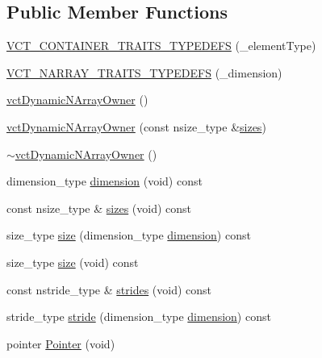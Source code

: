 \subsection*{Public Member Functions}
\begin{DoxyCompactItemize}
\item 
\hyperlink{classvct_dynamic_n_array_owner_af8830d5911394c8a495eb40b5a94d23e}{V\+C\+T\+\_\+\+C\+O\+N\+T\+A\+I\+N\+E\+R\+\_\+\+T\+R\+A\+I\+T\+S\+\_\+\+T\+Y\+P\+E\+D\+E\+F\+S} (\+\_\+element\+Type)
\item 
\hyperlink{classvct_dynamic_n_array_owner_af1c5a0cfd6c57067bd63c10e078c20c8}{V\+C\+T\+\_\+\+N\+A\+R\+R\+A\+Y\+\_\+\+T\+R\+A\+I\+T\+S\+\_\+\+T\+Y\+P\+E\+D\+E\+F\+S} (\+\_\+dimension)
\item 
\hyperlink{classvct_dynamic_n_array_owner_ad2d71d606a6d085370fe1ba2898819ca}{vct\+Dynamic\+N\+Array\+Owner} ()
\item 
\hyperlink{classvct_dynamic_n_array_owner_a7aa030ce966293a84cadb4ba56334858}{vct\+Dynamic\+N\+Array\+Owner} (const nsize\+\_\+type \&\hyperlink{classvct_dynamic_n_array_owner_a014679026d1c8b3c3f07170c58ece520}{sizes})
\item 
\hyperlink{classvct_dynamic_n_array_owner_a37650cc7a003a5fc2398c21885ac76ed}{$\sim$vct\+Dynamic\+N\+Array\+Owner} ()
\item 
dimension\+\_\+type \hyperlink{classvct_dynamic_n_array_owner_ab6cc3614780f6befef472c6bdc790a2a}{dimension} (void) const 
\item 
const nsize\+\_\+type \& \hyperlink{classvct_dynamic_n_array_owner_a014679026d1c8b3c3f07170c58ece520}{sizes} (void) const 
\item 
size\+\_\+type \hyperlink{classvct_dynamic_n_array_owner_a1ef1e879390b1b619c67a521c4337312}{size} (dimension\+\_\+type \hyperlink{classvct_dynamic_n_array_owner_ab6cc3614780f6befef472c6bdc790a2a}{dimension}) const 
\item 
size\+\_\+type \hyperlink{classvct_dynamic_n_array_owner_a713529c4585569ddd8c9f66b61607212}{size} (void) const 
\item 
const nstride\+\_\+type \& \hyperlink{classvct_dynamic_n_array_owner_ac2b1c11c3cbb7ec9351f80177ab9b7b2}{strides} (void) const 
\item 
stride\+\_\+type \hyperlink{classvct_dynamic_n_array_owner_a21c27bbbada4be86f91faa2c3325e81d}{stride} (dimension\+\_\+type \hyperlink{classvct_dynamic_n_array_owner_ab6cc3614780f6befef472c6bdc790a2a}{dimension}) const 
\item 
pointer \hyperlink{classvct_dynamic_n_array_owner_a9ac9adb258e8d104e3ceaf962623b226}{Pointer} (void)

\end{DoxyCompactItemize}
